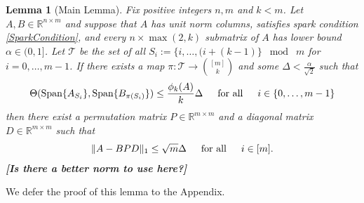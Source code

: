 \documentclass[journal, onecolumn]{IEEEtran}
\newtheorem{lemma}{Lemma}
\begin{document}
\begin{lemma}[Main Lemma]\label{MainLemma}
Fix positive integers $n, m$ and $k < m$. Let $A, B \in \mathbb{R}^{n \times m}$ and suppose that $A$ has unit norm columns, satisfies spark condition \eqref{SparkCondition}, and every $n \times \max(2,k)$ submatrix of $A$ has lower bound $\alpha \in (0,1]$. Let $\mathcal{T}$ be the set of all $S_i := \{i, \ldots, (i + (k-1) \} \;\bmod\; m$ for $i = 0, \ldots, m-1$. If there exists a map $\pi: \mathcal{T} \to {[m] \choose k}$ and some $\Delta < \frac{\alpha}{\sqrt{2}}$ such that 
\begin{equation}\label{GapUpperBound}
\Theta(\text{Span}\{A_{S_i}\}, \text{Span}\{B_{\pi(S_i)}\}) \leq \frac{ \phi_k(A) }{k} \Delta \indent \text{for all} \indent i \in \{0, \ldots, m-1\}
\end{equation}
%
then there exist a permutation matrix $P \in \mathbb{R}^{m \times m}$ and a diagonal matrix $D \in \mathbb{R}^{m \times m}$ such that
\begin{align}
\|A - BPD\|_1 \leq \sqrt{m}\Delta \indent \text{for all} \indent i \in [m].
\end{align}
\textbf{[Is there a better norm to use here?]}
\end{lemma}

We defer the proof of this lemma to the Appendix. 

\end{document}
